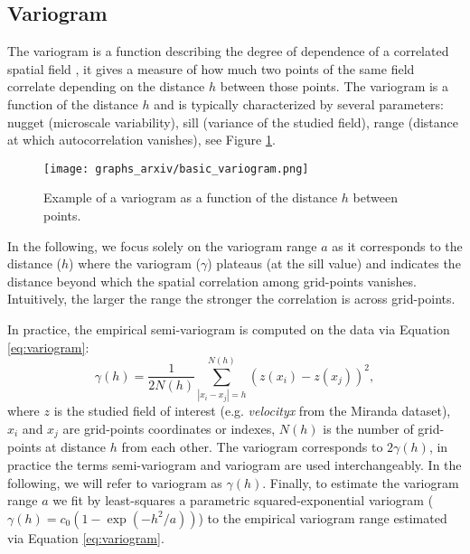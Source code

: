 \documentclass[conference]{IEEEtran}
\begin{document}
\subsection{Variogram}
The variogram is a function describing the degree of dependence of a correlated spatial field \cite{matheron1963, gelfand2010}, it gives a measure of how much two points of the same field correlate depending on the distance $h$ between those points. 
The variogram is a function of the distance $h$ and is typically characterized by several parameters: nugget  (microscale variability), sill (variance of the studied field), range (distance at which autocorrelation vanishes), see Figure \ref{fig:variogram}. 
\begin{figure}
\centering
\texttt{[image: graphs\_arxiv/basic\_variogram.png]}
\vspace{-20pt}
\caption{Example of a variogram as a function of the  distance $h$ between points. }
\label{fig:variogram}
\vspace{-10pt}
\end{figure}
%
In the following, we focus solely on the variogram range $a$ as it corresponds to the distance ($h$) where the variogram ($\gamma$) plateaus (at the sill value) and indicates the distance beyond which the spatial correlation among grid-points vanishes.  
Intuitively, the larger the range the stronger the correlation is across grid-points. 

In practice, the empirical semi-variogram is computed on the data via Equation \eqref{eq:variogram}:
%
\begin{equation}\label{eq:variogram}
\displaystyle \gamma(h) = \frac{1}{2N(h)}\sum_{|x_i - x_j|=h}^{N(h)}\left ( z(x_i)-z(x_j) \right)^2,
\end{equation}
%
where $z$ is the studied field of interest (e.g. \textit{velocityx} from the Miranda dataset), $x_i$ and $x_j$ are grid-points coordinates or indexes, $N(h)$ is the number of grid-points at distance $h$ from each other. 
The variogram corresponds to $2\gamma(h)$, in practice the terms semi-variogram and variogram are used interchangeably. In the following, we will refer to variogram as $\gamma(h)$. 
Finally, to estimate the variogram range $a$ we fit by least-squares a parametric squared-exponential variogram ($\gamma(h) = c_{0} (1-\exp(-h^2/a)) $) to the empirical variogram range estimated via Equation \eqref{eq:variogram}. 
\end{document}
